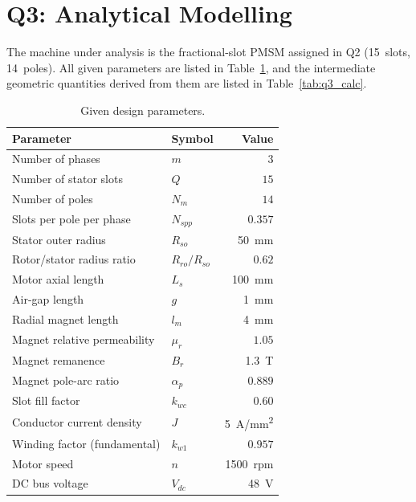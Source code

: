 \documentclass[12pt, a4paper]{article}
\begin{document}
\section{Q3: Analytical Modelling}

The machine under analysis is the fractional-slot PMSM assigned in Q2
(15~slots, 14~poles). All given parameters are listed in
Table~\ref{tab:q3_given}, and the intermediate geometric quantities
derived from them are listed in Table~\ref{tab:q3_calc}.

\begin{table}[h!]
\centering
\caption{Given design parameters.}
\label{tab:q3_given}
\begin{tabular}{llr}
\toprule
\textbf{Parameter} & \textbf{Symbol} & \textbf{Value} \\
\midrule
Number of phases              & $m$          & $3$ \\
Number of stator slots        & $Q$          & $15$ \\
Number of poles               & $N_m$        & $14$ \\
Slots per pole per phase      & $N_{spp}$    & $0.357$ \\
Stator outer radius           & $R_{so}$     & \SI{50}{mm} \\
Rotor/stator radius ratio     & $R_{ro}/R_{so}$ & $0.62$ \\
Motor axial length            & $L_s$        & \SI{100}{mm} \\
Air-gap length                & $g$          & \SI{1}{mm} \\
Radial magnet length          & $l_m$        & \SI{4}{mm} \\
Magnet relative permeability  & $\mu_r$      & $1.05$ \\
Magnet remanence              & $B_r$        & \SI{1.3}{T} \\
Magnet pole-arc ratio         & $\alpha_p$   & $0.889$ \\
Slot fill factor              & $k_{wc}$     & $0.60$ \\
Conductor current density     & $J$          & \SI{5}{A/mm^2} \\
Winding factor (fundamental)  & $k_{w1}$     & $0.957$ \\
Motor speed                   & $n$          & \SI{1500}{rpm} \\
DC bus voltage                & $V_{dc}$     & \SI{48}{V} \\
\bottomrule
\end{tabular}
\end{table}
\end{document}
